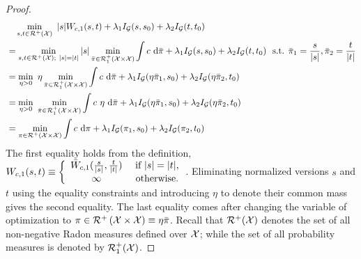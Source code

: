 \begin{proof}
\begin{align}
    &\quad \min\limits_{s,t\in\calR^+(\calX)}\  |s| W_{c, 1}(s,t) + \lambda_1  I_\calG(s,s_0) + \lambda_2  I_\calG(t,t_0) \nonumber\\
    & = \min\limits_{s,t\in\calR^+(\calX);~|s|=|t|} |s| \min\limits_{\bar{\pi}\in \calR_1^+\left(\calX\times\calX\right)} \int c \ \textup{d}\bar{\pi} + \lambda_1  I_\calG(s, s_0)+\lambda_2  I_\calG(t, t_0) \ \textup{ s.t. }\bar{\pi}_1=\frac{s}{|s|}, \bar{\pi}_2=\frac{t}{|t|} \nonumber \\
    & = \min\limits_{\eta>0} ~ \eta \min\limits_{\bar{\pi}\in \calR_1^+\left(\calX\times\calX\right)} \int c \ \textup{d}\bar{\pi} + \lambda_1  I_\calG(\eta\bar{\pi}_1, s_0)+\lambda_2  I_\calG(\eta\bar{\pi}_2, t_0) \nonumber \\
    & = \min\limits_{\eta>0} ~ \min\limits_{\bar{\pi}\in \calR_1^+\left(\calX\times\calX\right)} \int c\ \eta \ \textup{d}\bar{\pi} +\lambda_1  I_\calG(\eta\bar{\pi}_1, s_0)+\lambda_2  I_\calG(\eta\bar{\pi}_2, t_0) \nonumber\\
    & = \min\limits_{\pi\in\calR^+\left(\calX\times \calX\right)}\int c ~\textup{d}\pi+\lambda_1  I_\calG(\pi_1, s_0)+\lambda_2  I_\calG(\pi_2, t_0) \nonumber
\end{align}
The first equality holds from the definition, $W_{c,1}(s,t)\equiv\left\{\begin{array}{cc}
    \bar{W}_{c, 1}(\frac{s}{|s|},\frac{t}{|t|}) & \textup{ if } |s|=|t|, \\
    \infty & \textup{ otherwise}.
\end{array}\right.$. Eliminating normalized versions $s$ and $t$ using the equality constraints and introducing $\eta$ to denote their common mass gives the second equality.  The last equality comes after changing the variable of optimization to $\pi\in\mathcal{R}^+\left(\mathcal{X}\times \mathcal{X}\right) \equiv \eta\bar{\pi}$. Recall that $\mathcal{R}^+(\mathcal{X})$ denotes the set of all non-negative Radon measures defined over $\mathcal{X}$; while the set of all probability measures is denoted by $\mathcal{R}^+_1(\mathcal{X})$.
\end{proof}

